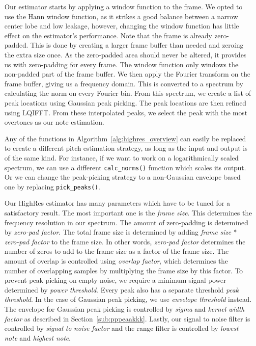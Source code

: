 \documentclass[a4paper,10pt,twocolumn]{article}
\begin{document}
Our estimator starts by applying a window function to the frame. We opted to use the Hann window function, as it strikes a good balance between a narrow center lobe and low leakage, however, changing the window function has little effect on the estimator's performance. Note that the frame is already zero-padded. This is done by creating a larger frame buffer than needed and zeroing the extra size once. As the zero-padded area should never be altered, it provides us with zero-padding for every frame. The window function only windows the non-padded part of the frame buffer. We then apply the Fourier transform on the frame buffer, giving us a frequency domain. This is converted to a spectrum by calculating the norm on every Fourier bin. From this spectrum, we create a list of peak locations using Gaussian peak picking. The peak locations are then refined using LQIFFT. From these interpolated peaks, we select the peak with the most overtones as our note estimation. %

Any of the functions in Algorithm~\ref{alg:highres_overview} can easily be replaced to create a different pitch estimation strategy, as long as the input and output is of the same kind. For instance, if we want to work on a logarithmically scaled spectrum, we can use a different \texttt{calc\_norms()} function which scales its output. Or we can change the peak-picking strategy to a non-Gaussian envelope based one by replacing \texttt{pick\_peaks()}.

Our HighRes estimator has many parameters which have to be tuned for a satisfactory result. The most important one is the \textit{frame size}. This determines the frequency resolution in our spectrum. The amount of zero-padding is determined by \textit{zero-pad factor}. The total frame size is determined by adding \textit{frame size} * \textit{zero-pad factor} to the frame size. In other words, \textit{zero-pad factor} determines the number of zeros to add to the frame size as a factor of the frame size. The amount of overlap is controlled using \textit{overlap factor}, which determines the number of overlapping samples by multiplying the frame size by this factor. To prevent peak picking on empty noise, we require a minimum signal power determined by \textit{power threshold}. Every peak also has a separate threshold \textit{peak threshold}. In the case of Gaussian peak picking, we use \textit{envelope threshold} instead. The envelope for Gaussian peak picking is controlled by \textit{sigma} and \textit{kernel width factor} as described in Section~\ref{sub:pppeaakkk}. Lastly, our signal to noise filter is controlled by \textit{signal to noise factor} and the range filter is controlled by \textit{lowest note} and \textit{highest note}.
\end{document}
